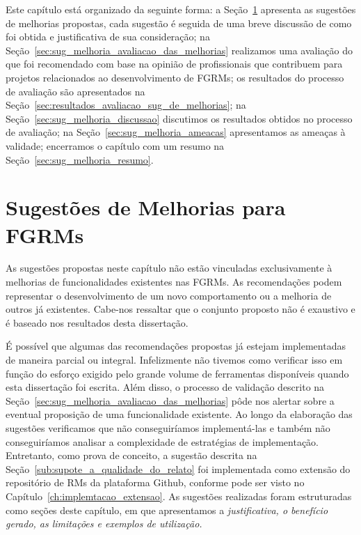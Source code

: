 Este capítulo está organizado da seguinte forma: a
Seção~\ref{sec:sug_melhoria_melhorando_as_ferraementas} apresenta as sugestões
de melhorias propostas, cada sugestão é seguida de uma breve discussão de como
foi obtida e justificativa de sua consideração; na
Seção~\ref{sec:sug_melhoria_avaliacao_das_melhorias} realizamos uma avaliação do
que foi recomendado com base na opinião de profissionais que contribuem para
projetos relacionados ao desenvolvimento de FGRMs; os resultados do processo de
avaliação são apresentados na
Seção~\ref{sec:resultados_avaliacao_sug_de_melhorias}; na
Seção~\ref{sec:sug_melhoria_discussao} discutimos os resultados obtidos no
processo de avaliação; na Seção~\ref{sec:sug_melhoria_ameacas} apresentamos as
ameaças à validade; encerramos o capítulo com um resumo na
Seção~\ref{sec:sug_melhoria_resumo}.

\section{Sugestões de Melhorias para FGRMs}
\label{sec:sug_melhoria_melhorando_as_ferraementas}

As sugestões propostas neste capítulo não estão vinculadas exclusivamente à
melhorias de funcionalidades existentes nas FGRMs. As recomendações podem
representar o desenvolvimento de um novo comportamento ou a melhoria de outros
já existentes. Cabe-nos ressaltar que o conjunto proposto não é exaustivo e é
baseado nos resultados desta dissertação.

É possível que algumas das recomendações propostas já estejam implementadas de
maneira parcial ou integral.  Infelizmente não tivemos como verificar isso em
função do esforço exigido pelo grande volume de ferramentas disponíveis quando
esta dissertação foi escrita. Além disso, o processo de validação descrito na
Seção~\ref{sec:sug_melhoria_avaliacao_das_melhorias} pôde nos alertar sobre a
eventual proposição de uma funcionalidade existente. Ao longo da elaboração das
sugestões verificamos que não conseguiríamos implementá-las e também não
conseguiríamos analisar a complexidade de estratégias de implementação.
Entretanto, como prova de conceito, a sugestão descrita na
Seção~\ref{sub:supote_a_qualidade_do_relato} foi implementada como extensão do
repositório de RMs da plataforma Github, conforme pode ser visto no
Capítulo~\ref{ch:implemtacao_extensao}. As sugestões realizadas foram
estruturadas como seções deste capítulo, em que apresentamos a
\textit{justificativa, o benefício gerado, as limitações e exemplos de
    utilização.}

